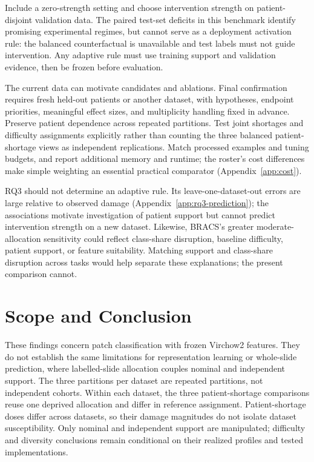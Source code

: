 \documentclass[11pt]{article}
\begin{document}
Include a zero-strength setting and choose intervention strength on patient-disjoint validation data. The paired test-set deficits in this benchmark identify promising experimental regimes, but cannot serve as a deployment activation rule: the balanced counterfactual is unavailable and test labels must not guide intervention. Any adaptive rule must use training support and validation evidence, then be frozen before evaluation.

The current data can motivate candidates and ablations. Final confirmation requires fresh held-out patients or another dataset, with hypotheses, endpoint priorities, meaningful effect sizes, and multiplicity handling fixed in advance. Preserve patient dependence across repeated partitions. Test joint shortages and difficulty assignments explicitly rather than counting the three balanced patient-shortage views as independent replications. Match processed examples and tuning budgets, and report additional memory and runtime; the roster's cost differences make simple weighting an essential practical comparator (Appendix~\ref{app:cost}).

RQ3 should not determine an adaptive rule. Its leave-one-dataset-out errors are large relative to observed damage (Appendix~\ref{app:rq3-prediction}); the associations motivate investigation of patient support but cannot predict intervention strength on a new dataset. Likewise, BRACS's greater moderate-allocation sensitivity could reflect class-share disruption, baseline difficulty, patient support, or feature suitability. Matching support and class-share disruption across tasks would help separate these explanations; the present comparison cannot.

\section{Scope and Conclusion}
\label{sec:limits}
These findings concern patch classification with frozen Virchow2 features. They do not establish the same limitations for representation learning or whole-slide prediction, where labelled-slide allocation couples nominal and independent support. The three partitions per dataset are repeated partitions, not independent cohorts. Within each dataset, the three patient-shortage comparisons reuse one deprived allocation and differ in reference assignment. Patient-shortage doses differ across datasets, so their damage magnitudes do not isolate dataset susceptibility. Only nominal and independent support are manipulated; difficulty and diversity conclusions remain conditional on their realized profiles and tested implementations.
\end{document}
